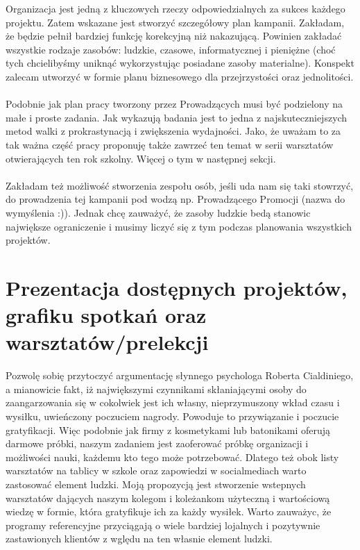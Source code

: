 \documentclass[9pt,a4paper]{report}
\begin{document}
Organizacja jest jedną z kluczowych rzeczy odpowiedzialnych za sukces każdego projektu. Zatem wskazane jest stworzyć szczegółowy plan kampanii. Zakładam, że będzie pełnił bardziej funkcję korekcyjną niż nakazującą. Powinien zakładać wszystkie rodzaje zasobów: ludzkie, czasowe, informatycznej i pieniężne (choć tych chcielibyśmy uniknąć wykorzystując posiadane zasoby materialne). Konspekt zalecam utworzyć w formie planu biznesowego dla przejrzystości oraz jednolitości.\\\\

Podobnie jak plan pracy tworzony przez Prowadzących musi być podzielony na małe i proste zadania. Jak wykazują badania jest to jedna z najskuteczniejszych metod walki z prokrastynacją i zwiększenia wydajności. Jako, że uważam to za tak ważna część pracy proponuję także zawrzeć ten temat w serii warsztatów otwierających ten rok szkolny. Więcej o tym w następnej sekcji.\\\\

Zakładam też możliwość stworzenia zespołu osób, jeśli uda nam się taki stowrzyć, do prowadzenia tej kampanii pod wodzą np. Prowadzącego Promocji (nazwa do wymyślenia :)). Jednak chcę zauważyć, że zasoby ludzkie bedą stanowic największe ograniczenie i musimy liczyć się z tym podczas planowania wszystkich projektów.

\section{Prezentacja dostępnych projektów, grafiku spotkań oraz warsztatów/prelekcji}
\label{section:cial}

Pozwolę sobię przytoczyć argumentację słynnego psychologa Roberta Cialdiniego, a mianowicie fakt, iż największymi czynnikami skłaniającymi osoby do zaangarzowania się w cokolwiek jest ich własny, nieprzymuszony wkład czasu i wysiłku, uwieńczony poczuciem nagrody. Powoduje to przywiązanie i poczucie gratyfikacji. Więc podobnie jak firmy z kosmetykami lub batonikami oferują darmowe próbki, naszym zadaniem jest zaoferować próbkę organizacji i możliwości nauki, każdemu kto tego może potrzebować. Dlatego też obok listy warsztatów na tablicy w szkole oraz zapowiedzi w socialmediach warto zastosować element ludzki. Moją propozycją jest stworzenie wstepnych warsztatów dających naszym kolegom i koleżankom użyteczną i wartościową wiedzę w formie, która gratyfikuje ich za każdy wysiłek. Warto zauważyc, że programy referencyjne przyciągają o wiele bardziej lojalnych i pozytywnie zastawionych klientów z wględu na ten własnie element ludzki.\\\\
\end{document}
